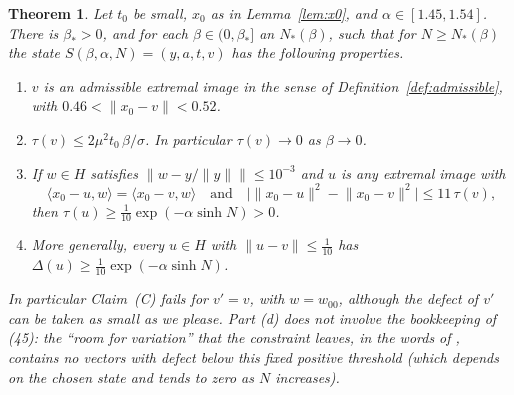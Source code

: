 \documentclass[11pt]{article}
\newtheorem{theorem}{Theorem}
\theoremstyle{definition}
\newcommand{\ip}[2]{\langle #1,#2\rangle}
\newcommand{\norm}[1]{\lVert #1\rVert}
\begin{document}
\begin{theorem}\label{thm:main}
Let $t_0$ be small, $x_0$ as in Lemma~\ref{lem:x0}, and $\alpha\in[1.45,1.54]$. There is
$\beta_*>0$, and for each $\beta\in(0,\beta_*]$ an $N_*(\beta)$, such that for
$N\ge N_*(\beta)$ the state $S(\beta,\alpha,N)=(y,a,t,v)$ has the following properties.
\begin{enumerate}[label=\textup{(\alph*)}]
\item $v$ is an admissible extremal image in the sense of
Definition~\ref{def:admissible}, with $0.46<\norm{x_0-v}<0.52$.
\item $\tau(v)\le2\mu^2t_0\,\beta/\sigma$. In particular $\tau(v)\to0$ as $\beta\to0$.
\item If $w\in H$ satisfies $\norm{w-y/\norm y}\le10^{-3}$ and $u$ is any extremal image with
\[
\ip{x_0-u}{w}=\ip{x_0-v}{w}\quad\text{and}\quad
\bigl|\norm{x_0-u}^2-\norm{x_0-v}^2\bigr|\le11\,\tau(v),
\]
then $\tau(u)\ge\frac1{10}\exp(-\alpha\sinh N)>0$.
\item More generally, every $u\in H$ with $\norm{u-v}\le\frac1{10}$ has
$\Delta(u)\ge\frac1{10}\exp(-\alpha\sinh N)$.
\end{enumerate}
In particular Claim~\textup{(C)} fails for $v'=v$, with $w=w_{00}$, although the defect of
$v'$ can be taken as small as we please. Part \textup{(d)} does not involve the bookkeeping
of \textup{(45)}: the ``room for variation'' that the constraint leaves, in the words of
\cite{E}, contains no vectors with defect below this fixed positive threshold (which
depends on the chosen state and tends to zero as $N$ increases).
\end{theorem}
\end{document}

